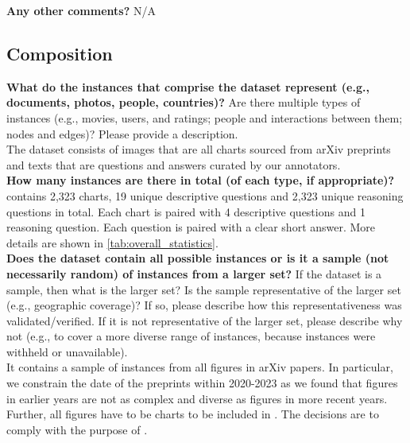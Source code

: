     \textcolor{\sectioncolor}{\textbf{Any other comments?
    }} N/A \\

\subsection{Composition}
    \textcolor{\sectioncolor}{\textbf{What do the instances that comprise the dataset represent (e.g., documents,
    photos, people, countries)?
    }
    Are there multiple types of instances (e.g., movies, users, and ratings;
    people and interactions between them; nodes and edges)? Please provide a
    description.
    } \\
    The dataset consists of images that are all charts sourced from arXiv preprints and texts that are questions and answers curated by our annotators. \\
    
    \textcolor{\sectioncolor}{\textbf{How many instances are there in total (of each type, if appropriate)?
    }
    } \\
    \ours{} contains 2,323 charts, 19 unique descriptive questions and 2,323 unique reasoning questions in total. Each chart is paired with 4 descriptive questions and 1 reasoning question. Each question is paired with a clear short answer. More details are shown in \cref{tab:overall_statistics}. \\
    
    \textcolor{\sectioncolor}{\textbf{Does the dataset contain all possible instances or is it a sample (not
    necessarily random) of instances from a larger set?
    }
    If the dataset is a sample, then what is the larger set? Is the sample
    representative of the larger set (e.g., geographic coverage)? If so, please
    describe how this representativeness was validated/verified. If it is not
    representative of the larger set, please describe why not (e.g., to cover a
    more diverse range of instances, because instances were withheld or
    unavailable).
    } \\
    It contains a sample of instances from all figures in arXiv papers. In particular, we constrain the date of the preprints within 2020-2023 as we found that figures in earlier years are not as complex and diverse as figures in more recent years. Further, all figures have to be charts to be included in \ours{}. The decisions are to comply with the purpose of \ours{}. \\
    
